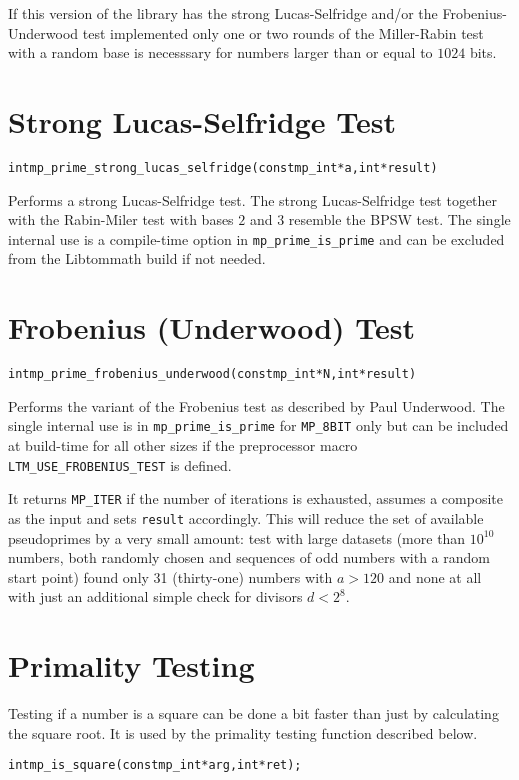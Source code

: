 \documentclass[synpaper]{book}
\begin{document}
If this version of the library has the strong Lucas-Selfridge and/or the Frobenius-Underwood test implemented only one or two rounds of the Miller-Rabin test with a random base is necesssary for numbers larger than or equal to $1024$ bits.


\section{Strong Lucas-Selfridge Test}
\begin{alltt}
int mp_prime_strong_lucas_selfridge(const mp_int *a, int *result)
\end{alltt}
Performs a strong Lucas-Selfridge test. The strong Lucas-Selfridge test together with the Rabin-Miler test with bases $2$ and $3$ resemble the BPSW test. The single internal use is a compile-time option in \texttt{mp\_prime\_is\_prime} and can be excluded
from the Libtommath build if not needed.

\section{Frobenius (Underwood)  Test}
\begin{alltt}
int mp_prime_frobenius_underwood(const mp_int *N, int *result)
\end{alltt}
Performs the variant of the Frobenius test as described by Paul Underwood. The single internal use is in
\texttt{mp\_prime\_is\_prime} for \texttt{MP\_8BIT} only but can be included at build-time for all other sizes
if the preprocessor macro \texttt{LTM\_USE\_FROBENIUS\_TEST} is defined.

It returns \texttt{MP\_ITER} if the number of iterations is exhausted, assumes a composite as the input and sets \texttt{result} accordingly. This will reduce the set of available pseudoprimes by a very small amount: test with large datasets (more than $10^{10}$ numbers, both randomly chosen and sequences of odd numbers with a random start point) found only 31 (thirty-one) numbers with $a > 120$ and none at all with just an additional simple check for divisors $d < 2^8$.

\section{Primality Testing}
Testing if a number is a square can be done a bit faster than just by calculating the square root. It is used by the primality testing function described below.
\begin{alltt}
int mp_is_square(const mp_int *arg, int *ret);
\end{alltt}
\end{document}
